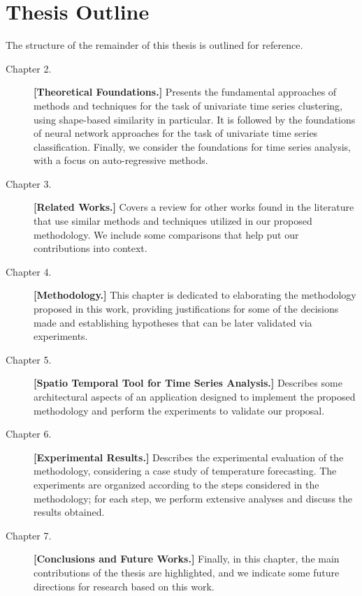 \section{Thesis Outline}
\label{Sec:ThesisOutline}

The structure of the remainder of this thesis is outlined for reference.

\begin{description}
\item[Chapter 2.] \textbf{[Theoretical Foundations.]} Presents the fundamental approaches of methods and techniques for the task of univariate time series clustering, using shape-based similarity in particular. It is followed by the foundations of neural network approaches for the task of univariate time series classification. Finally, we consider the foundations for time series analysis, with a focus on auto-regressive methods.

\item[Chapter 3.] \textbf{[Related Works.]} Covers a review for other works found in the literature that use similar methods and techniques utilized in our proposed methodology. We include some comparisons that help put our contributions into context. %

\item[Chapter 4.] \textbf{[Methodology.]} This chapter is dedicated to elaborating the methodology proposed in this work, providing justifications for some of the decisions made and establishing hypotheses that can be later validated via experiments.

\item[Chapter 5.] \textbf{[Spatio Temporal Tool for Time Series Analysis.]} Describes some architectural aspects of an application designed to implement the proposed methodology and perform the experiments to validate our proposal.

\item[Chapter 6.] \textbf{[Experimental Results.]} Describes the experimental evaluation of the methodology, considering a case study of temperature forecasting. The experiments are organized according to the steps considered in the methodology; for each step, we perform extensive analyses and discuss the results obtained. 

\item[Chapter 7.] \textbf{[Conclusions and Future Works.]} Finally, in this chapter, the main contributions of the thesis are highlighted, and we indicate some future directions for research based on this work.

\end{description}


